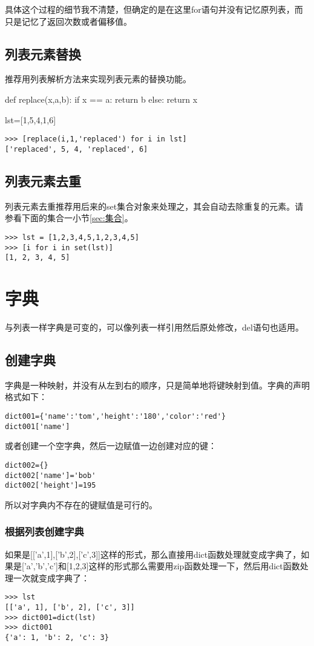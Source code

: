 \documentclass[12pt,oneside]{book}
\begin{document}
\begin{common-format}
具体这个过程的细节我不清楚，但确定的是在这里for语句并没有记忆原列表，而只是记忆了返回次数或者偏移值。

\subsection{列表元素替换}
推荐用列表解析方法来实现列表元素的替换功能。
\begin{tcbpython}[]
def replace(x,a,b):
    if x == a:
        return b
    else:
        return x

lst=[1,5,4,1,6]
\end{tcbpython}
\begin{Verbatim}
>>> [replace(i,1,'replaced') for i in lst]
['replaced', 5, 4, 'replaced', 6]
\end{Verbatim}

\subsection{列表元素去重}
列表元素去重推荐用后来的set集合对象来处理之，其会自动去除重复的元素。请参看下面的集合一小节\ref{sec:集合}。
\begin{Verbatim}
>>> lst = [1,2,3,4,5,1,2,3,4,5]
>>> [i for i in set(lst)]
[1, 2, 3, 4, 5]
\end{Verbatim}


\section{字典}
与列表一样字典是可变的，可以像列表一样引用然后原处修改，del语句也适用。

\subsection{创建字典}
字典是一种映射，并没有从左到右的顺序，只是简单地将键映射到值。字典的声明格式如下：
\begin{Verbatim}
dict001={'name':'tom','height':'180','color':'red'}
dict001['name']
\end{Verbatim}

或者创建一个空字典，然后一边赋值一边创建对应的键：
\begin{Verbatim}
dict002={}
dict002['name']='bob'
dict002['height']=195
\end{Verbatim}

所以对字典内不存在的键赋值是可行的。

\subsubsection{根据列表创建字典}
如果是[['a',1],['b',2],['c',3]]这样的形式，那么直接用dict函数处理就变成字典了，如果是['a','b','c']和[1,2,3]这样的形式那么需要用zip函数处理一下，然后用dict函数处理一次就变成字典了：
\begin{Verbatim}
>>> lst
[['a', 1], ['b', 2], ['c', 3]]
>>> dict001=dict(lst)
>>> dict001
{'a': 1, 'b': 2, 'c': 3}
\end{Verbatim}


\end{common-format}
\end{document}
